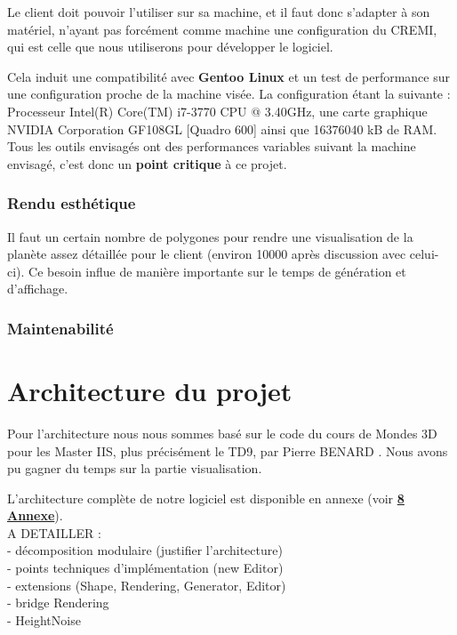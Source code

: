 \documentclass[a4paper]{article}
\begin{document}
Le client doit pouvoir l'utiliser sur sa machine, et il faut donc s'adapter à son matériel, n'ayant pas forcément comme machine une configuration du CREMI, qui est celle que nous utiliserons pour développer le logiciel.
        
Cela induit une compatibilité avec \textbf{Gentoo Linux} et un test de performance sur une configuration proche de la machine visée. La configuration étant la suivante : Processeur Intel(R) Core(TM) i7-3770 CPU @ 3.40GHz, une carte graphique NVIDIA Corporation GF108GL [Quadro 600] ainsi que 16376040 kB de RAM. Tous les outils envisagés ont des performances variables suivant la machine envisagé, c'est donc un \textbf{point critique} à ce projet.
        
\subsubsection{Rendu esthétique}
        
Il faut un certain nombre de polygones pour rendre une visualisation de la planète assez détaillée pour le client (environ 10000 après discussion avec celui-ci). Ce besoin influe de manière importante sur le temps de génération et d'affichage.

\subsubsection{Maintenabilité}

\newpage 
\section{Architecture du projet}


Pour l'architecture nous nous sommes basé sur le code du cours de Mondes 3D pour les Master IIS, plus précisément le TD9, par Pierre BENARD \cite{TD_3D}. Nous avons pu gagner du temps sur la partie visualisation. 

L'architecture complète de notre logiciel est disponible en annexe (voir \hyperref[archiComplete]{\textbf{8 Annexe}}). 
\\

A DETAILLER :\\
- décomposition modulaire (justifier l'architecture)\\
- points techniques d’implémentation (new Editor)\\
- extensions (Shape, Rendering, Generator, Editor)\\
- bridge Rendering\\
- HeightNoise
\end{document}
